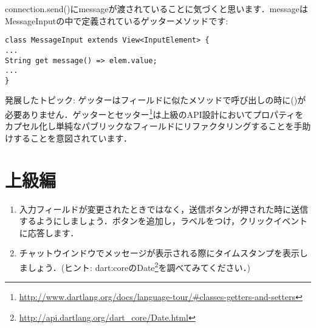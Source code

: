 connection.send()にmessageが渡されていることに気づくと思います．messageはMessageInputの中で定義されているゲッターメソッドです:

\begin{verbatim}
class MessageInput extends View<InputElement> {
...
String get message() => elem.value;
...
}
\end{verbatim}

発展したトピック: ゲッターはフィールドに似たメソッドで呼び出しの時に()が必要ありません．ゲッターとセッター\footnote{\url{http://www.dartlang.org/docs/language-tour/#classes-getters-and-setters}}は上級のAPI設計においてプロパティをカプセル化し単純なパブリックなフィールドにリファクタリングすることを手助けすることを意図されています．

\section{上級編}

\begin{enumerate}
\item 入力フィールドが変更されたときではなく，送信ボタンが押された時に送信するようにしましょう．ボタンを追加し，ラベルをつけ，クリックイベントに応答します．
\item チャットウインドウでメッセージが表示される際にタイムスタンプを表示しましょう．(ヒント: dart:coreのDate\footnote{\url{http://api.dartlang.org/dart_core/Date.html}}を調べてみてください．)
\end{enumerate}

\clearpage
